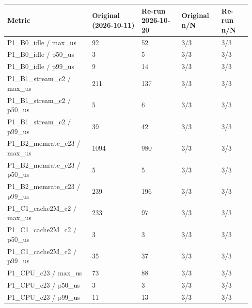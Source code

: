 \begin{tabular}{@{}lllll@{}}
\toprule
Metric & Original (2026-10-11) & Re-run 2026-10-20 & Original n/N & Re-run n/N \\
\midrule
P1\_B0\_idle / max\_us & 92 & 52 & 3/3 & 3/3 \\
P1\_B0\_idle / p50\_us & 3 & 5 & 3/3 & 3/3 \\
P1\_B0\_idle / p99\_us & 9 & 14 & 3/3 & 3/3 \\
P1\_B1\_stream\_c2 / max\_us & 211 & 137 & 3/3 & 3/3 \\
P1\_B1\_stream\_c2 / p50\_us & 5 & 6 & 3/3 & 3/3 \\
P1\_B1\_stream\_c2 / p99\_us & 39 & 42 & 3/3 & 3/3 \\
P1\_B2\_memrate\_c23 / max\_us & 1094 & 980 & 3/3 & 3/3 \\
P1\_B2\_memrate\_c23 / p50\_us & 5 & 5 & 3/3 & 3/3 \\
P1\_B2\_memrate\_c23 / p99\_us & 239 & 196 & 3/3 & 3/3 \\
P1\_C1\_cache2M\_c2 / max\_us & 233 & 97 & 3/3 & 3/3 \\
P1\_C1\_cache2M\_c2 / p50\_us & 3 & 3 & 3/3 & 3/3 \\
P1\_C1\_cache2M\_c2 / p99\_us & 35 & 37 & 3/3 & 3/3 \\
P1\_CPU\_c23 / max\_us & 73 & 88 & 3/3 & 3/3 \\
P1\_CPU\_c23 / p50\_us & 3 & 3 & 3/3 & 3/3 \\
P1\_CPU\_c23 / p99\_us & 11 & 13 & 3/3 & 3/3 \\
\bottomrule
\end{tabular}

